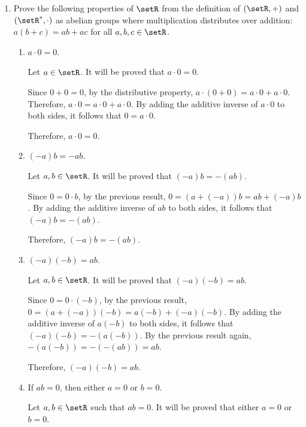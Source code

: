 



\begin{enumerate}
  \item Prove the following properties of \(\setR\) from the definition of \((\setR,+)\) and \((\setR^*,\cdot)\) as abelian groups where multiplication distributes over addition: \(a(b+c)=ab+ac\) for all \(a,b,c\in\setR\).
  \begin{enumerate}
    \item \(a\cdot 0=0\).
    \begin{subprove}
      Let \(a \in \setR\).
      It will be proved that \(a \cdot 0 = 0\).
      
      Since \(0 + 0 = 0\), by the distributive property, \(a \cdot (0 + 0) = a \cdot 0 + a \cdot 0\).
      Therefore, \(a \cdot 0 = a \cdot 0 + a \cdot 0\).
      By adding the additive inverse of \(a \cdot 0\) to both sides, it follows that \(0 = a \cdot 0\).
      
      Therefore, \(a \cdot 0 = 0\).
    \end{subprove}
    \item \((-a)b=-ab\).
    \begin{subprove}
      Let \(a, b \in \setR\).
      It will be proved that \((-a) b = - (a b)\).
      
      Since \(0 = 0 \cdot b\), by the previous result, \(0 = (a + (-a)) b = a b + (-a) b\).
      By adding the additive inverse of \(a b\) to both sides, it follows that \((-a) b = - (a b)\).
      
      Therefore, \((-a) b = - (a b)\).
    \end{subprove}
    \item \((-a)(-b)=ab\).
    \begin{subprove}
      Let \(a, b \in \setR\).
      It will be proved that \((-a)(-b) = a b\).
      
      Since \(0 = 0 \cdot (-b)\), by the previous result, \(0 = (a + (-a))(-b) = a(-b) + (-a)(-b)\).
      By adding the additive inverse of \(a(-b)\) to both sides, it follows that \((-a)(-b) = - (a(-b))\).
      By the previous result again, \(- (a(-b)) = - (-(a b)) = a b\).
      
      Therefore, \((-a)(-b) = a b\).
    \end{subprove}
    \item If \(ab=0\), then either \(a=0\) or \(b=0\).
    \begin{subprove}
      Let \(a, b \in \setR\) such that \(a b = 0\).
      It will be proved that either \(a = 0\) or \(b = 0\).
      

\end{subprove}
\end{enumerate}
\end{enumerate}
